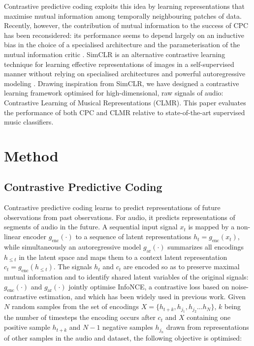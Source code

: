 \documentclass{report}
\begin{document}
Contrastive predictive coding exploits this idea by learning representations that maximise mutual information among temporally neighbouring patches of data\cite{oord_representation_2019, hjelm_learning_2019}. Recently, however, the contribution of mutual information to the success of CPC has been reconsidered: its performance seems to depend largely on an inductive bias in the choice of a specialised architecture and the parameterisation of the mutual information critic \cite{Tschannen2020OnMI}. SimCLR is an alternative contrastive learning technique for learning effective representations of images in a self-supervised manner without relying on specialised architectures and powerful autoregressive modeling \cite{chen_simple_2020}. Drawing inspiration from SimCLR, we have designed a contrastive learning framework optimised for high-dimensional, raw signals of audio: Contrastive Learning of Musical Representations (CLMR). This paper evaluates the performance of both CPC and CLMR relative to state-of-the-art supervised music classifiers.


\chapter{Method}

\section{Contrastive Predictive Coding}
Contrastive predictive coding learns to predict representations of future observations from past observations. For audio, it predicts representations of segments of audio in the future. A sequential input signal $x_t$ is mapped by a non-linear encoder $g_{\mathrm{enc}}(\cdot)$ to a sequence of latent representations $h_t = g_{\mathrm{enc}}(x_t)$, while simultaneously an autoregressive model $g_{\mathrm{ar}}(\cdot)$ summarizes all encodings $h_{\leq t}$ in the latent space and maps them to a context latent representation $c_t = g_{\mathrm{enc}}(h_{\leq t})$. The signals $h_t$ and $c_t$ are encoded so as to preserve maximal mutual information and to identify shared latent variables of the original signals: $g_{\mathrm{enc}}(\cdot)$ and $g_{\mathrm{ar}}(\cdot)$ jointly optimise InfoNCE, a contrastive loss based on noise-contrastive estimation\cite{gutmann_noise-contrastive_nodate}, and which has been widely used in previous work\cite{oord_representation_2019, sohn2020fixmatch, chen_simple_2020}. Given $N$ random samples from the set of encodings $X = \{h_{t+k}, h_{j_1}, h_{j_2} \hdots h_N\}$, $k$ being the number of timesteps the encoding occurs after $c_t$ and $X$ containing one positive sample $h_{t+k}$ and $N-1$ negative samples $h_{j_{n}}$ drawn from representations of other samples in the audio and dataset, the following objective is optimised:
\end{document}
